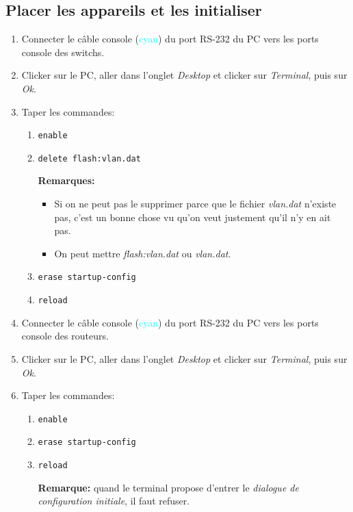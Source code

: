 \documentclass[a4paper]{article}
\begin{document}
\subsection{Placer les appareils et les initialiser}





\begin{enumerate}



\item Connecter le câble console (\textcolor{cyan}{cyan}) du port RS-232 du PC vers les ports console des switchs.
\item Clicker sur le PC, aller dans l'onglet \textit{Desktop} et clicker sur \textit{Terminal}, puis sur \textit{Ok}.
\item Taper les commandes:
\begin{enumerate}
    \item \texttt{enable}
    \item \texttt{delete flash:vlan.dat}
    \begin{example}
        \textbf{Remarques:}
        \begin{itemize}
            \item Si on ne peut pas le supprimer parce que le fichier \textit{vlan.dat} n'existe pas, c'est un bonne chose vu qu'on veut justement qu'il n'y en ait pas.
            \item On peut mettre \textit{flash:vlan.dat} ou \textit{vlan.dat}.
        \end{itemize}
    \end{example}
    \item \texttt{erase startup-config}
    \item \texttt{reload}
\end{enumerate}



\item Connecter le câble console (\textcolor{cyan}{cyan}) du port RS-232 du PC vers les ports console des routeurs.
\item Clicker sur le PC, aller dans l'onglet \textit{Desktop} et clicker sur \textit{Terminal}, puis sur \textit{Ok}.
\item Taper les commandes:
\begin{enumerate}
    \item \texttt{enable}
    \item \texttt{erase startup-config}
    \item \texttt{reload}
    \begin{example}
        \textbf{Remarque:} quand le terminal propose d'entrer le \textit{dialogue de configuration initiale}, il faut refuser.
    \end{example}
\end{enumerate}



\end{enumerate}
\end{document}
